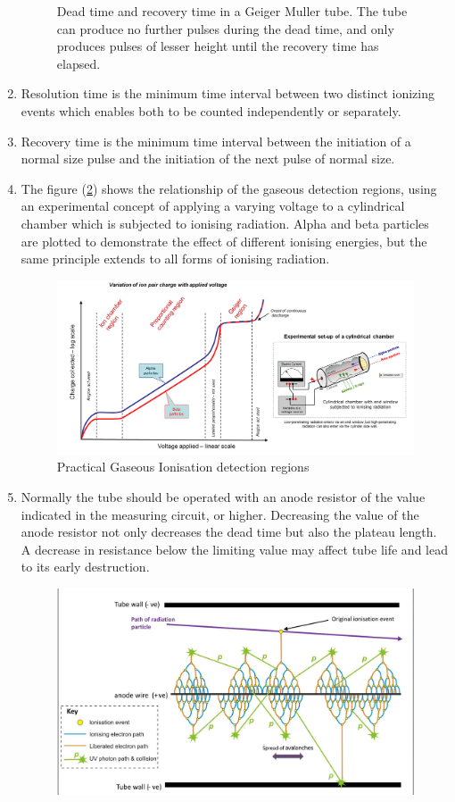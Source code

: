 \documentclass[%
 reprint,
nofootinbib,
 amsmath,amssymb,
 aps,
floatfix,
]{revtex4-2}
\begin{document}
\begin{enumerate}
\begin{figure}
        \caption{Dead time and recovery time in a Geiger Muller tube. The tube can produce no further pulses during the dead time, and only produces pulses of lesser height until the recovery time has elapsed.}
        \label{fig:disc-0}
    \end{figure}
    \item Resolution time is the minimum time interval between two distinct ionizing events which enables both to be counted independently or separately.
    \item Recovery time is the minimum time interval between the initiation of a normal size pulse and the initiation of the next pulse of normal size.
    \item The figure (\ref{fig:gaseous regions}) shows the relationship of the gaseous detection regions, using an experimental concept of applying a varying voltage to a cylindrical chamber which is subjected to ionising radiation. Alpha and beta particles are plotted to demonstrate the effect of different ionising energies, but the same principle extends to all forms of ionising radiation.
    \begin{figure}
        \centering
        \includegraphics[scale = 0.20]{Figures/Detector_regions.png}
        \caption{Practical Gaseous Ionisation detection regions}
        \label{fig:gaseous regions}
    \end{figure}
    \item Normally the tube should be operated with an anode resistor of the value indicated in the measuring circuit, or higher. Decreasing the value of the anode resistor not only decreases the dead time but also the plateau length. A decrease in resistance below the limiting value may affect tube life and lead to its early destruction.
    \begin{figure}
        \centering
        \includegraphics[scale = 0.3]{Figures/Spread_of_avalanches_in_G-M_tube.jpg}

\end{figure}
\end{enumerate}
\end{document}
